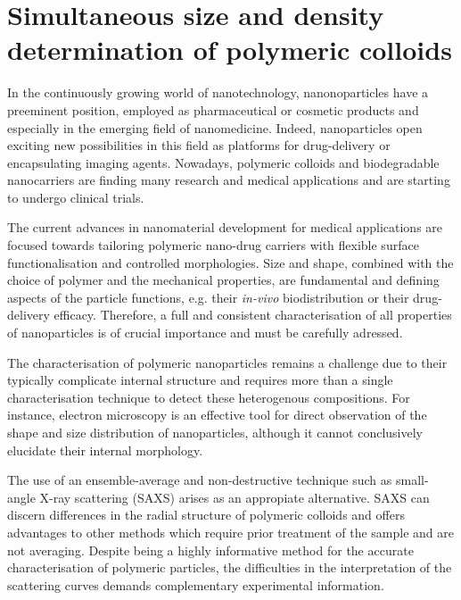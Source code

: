\chapter{Simultaneous size and density determination of polymeric colloids}
\label{chap:simultaneous_size_density}
In the continuously growing world of nanotechnology, nanonoparticles have a preeminent position, employed as pharmaceutical or cosmetic products\citep{guterres_polymeric_2007} and especially in the emerging field of nanomedicine. Indeed, nanoparticles open exciting new possibilities in this field as platforms for drug-delivery\citep{wang_nanoparticle_2012} or encapsulating imaging agents\citep{tao_shapespecific_2011}. Nowadays, polymeric colloids and biodegradable nanocarriers are finding many research and medical applications\citep{vicent_polymer_2006} and are starting to undergo clinical trials\citep{patel_polymeric_2012,beija_colloidal_2012,cabral_progress_2014}.

The current advances in nanomaterial development for medical applications are focused towards tailoring polymeric nano-drug carriers with flexible surface functionalisation and controlled morphologies\citep{euliss_imparting_2006,yang_shapememory_2005}. Size and shape, combined with the choice of polymer and the mechanical properties, are fundamental and defining aspects of the particle functions, e.g. their \emph{in-vivo} biodistribution\citep{vittaz_effect_1996,mitragotri_physical_2009,doshi_designer_2009} or their drug-delivery efficacy\citep{powers_research_2006}. Therefore, a full and consistent characterisation of all properties of nanoparticles is of crucial importance and must be carefully adressed.

The characterisation of polymeric nanoparticles remains a challenge due to their typically complicate internal structure\citep{beyer_saxs_1990} and requires more than a single characterisation technique to detect these heterogenous compositions. For instance, electron microscopy is an effective tool for direct observation of the shape and size distribution of nanoparticles, although it cannot conclusively elucidate their internal morphology.

The use of an ensemble-average and non-destructive technique such as small-angle X-ray scattering (SAXS) arises as an appropiate alternative\citep{leonardjr_size_1952,motzkus_untersuchung_1959}. SAXS can discern differences in the radial structure of polymeric colloids and offers advantages to other methods which require prior treatment of the sample and are not averaging\citep{silverstein_microstructure_1989,joensson_morphology_1991}. Despite being a highly informative method for the accurate characterisation of polymeric particles, the difficulties in the interpretation of the scattering curves demands complementary experimental information\citep{mykhaylyk_structural_2012}.

